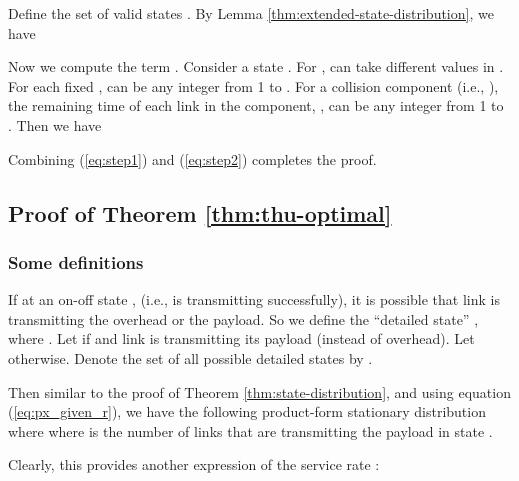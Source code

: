 \documentclass{IEEEtran}
\begin{document}
Define the set of valid states .
By Lemma \ref{thm:extended-state-distribution}, we have


Now we compute the term .
Consider a state .
For ,  can take different values in .
For each fixed ,  can be any integer from 1 to .
For a collision component  (i.e., ), the
remaining time of each link in the component, , can be any
integer from 1 to . Then we have 


Combining (\ref{eq:step1}) and (\ref{eq:step2}) completes the proof.


\subsection{\label{sub:Proof-of-rstar}Proof of Theorem \ref{thm:thu-optimal}}


\subsubsection{Some definitions}

If at an on-off state ,  (i.e.,  is transmitting
successfully), it is possible that link  is transmitting the overhead
or the payload. So we define the {}``detailed state'' ,
where . Let  if  and link
 is transmitting its payload (instead of overhead). Let 
otherwise. Denote the set of all possible detailed states 
by . 

Then similar to the proof of Theorem \ref{thm:state-distribution},
and using equation (\ref{eq:px_given_r}), we have the following product-form
stationary distribution
where 
where  is the number of links that are transmitting
the payload in state .

Clearly, this provides another expression of the service rate :
\medskip{}
\end{document}
